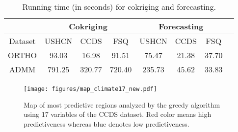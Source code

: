 \begin{table*}[t]
\caption{ Running time (in seconds)  for cokriging and forecasting.} %
\label{tab:real_runtime}
\vspace{-0.05in}
\begin{center}
\begin{tiny}
\begin{sc}
\centering  \footnotesize%
\begin{tabular}{c| c c c| c c c c} %
\hline
&\multicolumn{3}{c}{Cokriging}& \multicolumn{3}{c}{Forecasting}\\
\hline
\hline
Dataset & USHCN  & CCDS & FSQ &  USHCN  & CCDS & FSQ \\
\hline
ORTHO  & 93.03 & 16.98& 91.51  & 75.47 & 21.38& 37.70\\
ADMM &791.25 & 320.77 & 720.40 & 235.73 &45.62 & 33.83\\
\hline
\end{tabular}
\end{sc}
\end{tiny}
\end{center}
\vspace{-0.25in}
\end{table*}

\begin{wrapfigure}{r}{0.45\textwidth}
\vspace{-0.2in}
\begin{center}
    \texttt{[image: figures/map\_climate17\_new.pdf]}
  \end{center}
\vspace{-0.2in}
  \caption{ Map of most predictive regions analyzed by the greedy algorithm using 17 variables of  the CCDS dataset. Red color means high predictiveness whereas blue denotes low predictiveness.}
\end{wrapfigure}




